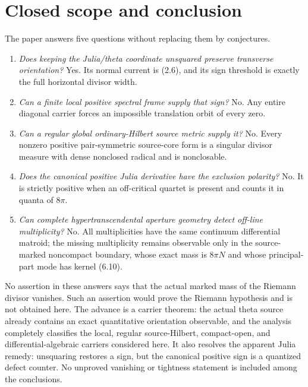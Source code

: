 \documentclass[11pt]{article}
\theoremstyle{definition}
\theoremstyle{remark}
\begin{document}
\section{Closed scope and conclusion}

The paper answers five questions without replacing them by conjectures.

\begin{enumerate}[label=\textup{(\arabic*)}]
\item \emph{Does keeping the Julia/theta coordinate unsquared preserve
      transverse orientation?}  Yes.  Its normal current is (2.6), and
      its sign threshold is exactly the full horizontal divisor width.
\item \emph{Can a finite local positive spectral frame supply that sign?}
      No.  Any entire diagonal carrier forces an impossible translation
      orbit of every zero.
\item \emph{Can a regular global ordinary-Hilbert source metric supply
      it?}  No.  Every nonzero positive pair-symmetric source-core form
      is a singular divisor measure with dense nonclosed radical and is
      nonclosable.
\item \emph{Does the canonical positive Julia derivative have the
      exclusion polarity?}  No.  It is strictly positive when an
      off-critical quartet is present and counts it in quanta of
      \(8\pi\).
\item \emph{Can complete hypertranscendental aperture geometry detect
      off-line multiplicity?}  No.  All multiplicities have the same
      continuum differential matroid; the missing multiplicity remains
      observable only in the source-marked noncompact boundary, whose
      exact mass is \(8\pi N\) and whose principal-part mode has kernel
      (6.10).
\end{enumerate}

No assertion in these answers says that the actual marked mass of the
Riemann divisor vanishes.  Such an assertion would prove the Riemann
hypothesis and is not obtained here.  The advance is a carrier theorem:
the actual theta source already contains an exact quantitative
orientation observable, and the analysis completely classifies the
local, regular source-Hilbert, compact-open, and differential-algebraic
carriers considered here.  It also resolves the apparent Julia remedy:
unsquaring restores a sign, but the canonical positive sign is a
quantized defect counter.  No unproved vanishing or tightness statement
is included among the conclusions.
\end{document}
